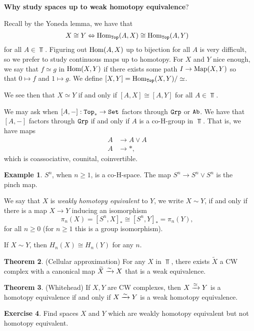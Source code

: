 \documentclass[12pt]{amsart}
\let\til\widetilde
\theoremstyle{definition}
\newtheorem{theorem}{Theorem}[section]
\newtheorem{example}[theorem]{Example}
\newtheorem{exercise}[theorem]{Exercise}
\begin{document}
\textbf{Why study spaces up to weak homotopy equivalence}?

Recall by the Yoneda lemma, we have that
\begin{align*}
    X \cong Y \Leftrightarrow \text{Hom}_{\texttt{Top}}(A,X) \cong \text{Hom}_{\texttt{Top}}(A,Y)
\end{align*}
for all $A\in \Top$. Figuring out $\text{Hom}(A,X)$ up to bijection for all $A$ is very difficult, so we prefer to study continuous maps up to homotopy. For $X$ and $Y$ nice enough, we say that $f\simeq g$ in $\text{Hom}(X,Y)$ if there exists some path $I \to \text{Map}(X,Y)$ so that $0 \mapsto f$ and $1 \mapsto g$. We define $[X,Y] = \text{Hom}_{\texttt{Top}}(X,Y)/\simeq$.

We see then that $X \simeq Y$ if and only if $[A,X] \cong [A,Y]$ for all $A \in \Top$.

We may ask when $[A,-] : \texttt{Top}_\ast \to \texttt{Set}$ factors through $\texttt{Grp}$ or $\texttt{Ab}$. We have that $[A,-]$ factors through $\texttt{Grp}$ if and only if $A$ is a co-H-group in $\Top$. That is, we have maps
\begin{align*}
    A &\to A \vee A \\
    A &\to \ast,
\end{align*}
which is coassociative, counital, coinvertible.

\begin{example} $S^n$, when $n \ge 1$, is a co-H-space. The map $S^n \to S^n \vee S^n$ is the pinch map.
\end{example}

We say that $X$ is \textit{weakly homotopy equivalent} to $Y$, we write $X \sim Y$, if and only if there is a map $X \to Y$ inducing an isomorphism 
\[
\pi_n(X) = [S^n,X]_\ast \cong [S^n,Y]_\ast = \pi_n(Y),
\]
for all $n \ge 0$ (for $n \ge 1$ this is a group isomorphism).

If $X \sim Y$, then $H_n(X) \cong H_n(Y)$ for any $n$.

\begin{theorem} (Cellular approximation) For any $X$ in $\Top$, there exists $\til{X}$ a CW complex with a canonical map $\til{X} \xto{\sim} X$ that is a weak equivalence.
\end{theorem}

\begin{theorem} (Whitehead) If $X,Y$ are CW complexes, then $X \xrightarrow{\simeq} Y$ is a homotopy equivalence if and only if $X \xrightarrow{\sim} Y$ is a weak homotopy equivalence.
\end{theorem}

\begin{exercise} Find spaces $X$ and $Y$ which are weakly homotopy equivalent but not homotopy equivalent.
\end{exercise}
\end{document}
